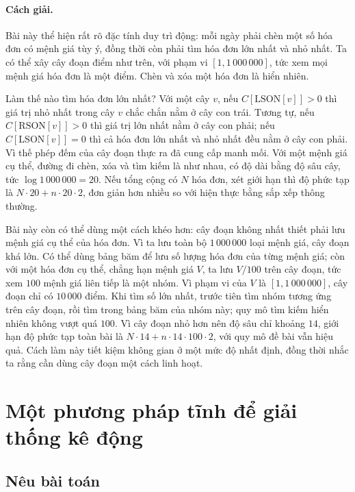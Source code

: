 \documentclass[11pt]{article}
\begin{document}
\paragraph{Cách giải.}
Bài này thể hiện rất rõ đặc tính duy trì động: mỗi ngày phải chèn một số hóa
đơn có mệnh giá tùy ý, đồng thời còn phải tìm hóa đơn lớn nhất và nhỏ nhất.
Ta có thể xây cây đoạn điểm như trên, với phạm vi \([1,1\,000\,000]\), tức
xem mọi mệnh giá hóa đơn là một điểm. Chèn và xóa một hóa đơn là hiển nhiên.

Làm thế nào tìm hóa đơn lớn nhất? Với một cây \(v\), nếu
\(C[\mathrm{LSON}[v]]>0\) thì giá trị nhỏ nhất trong cây \(v\) chắc chắn nằm
ở cây con trái. Tương tự, nếu \(C[\mathrm{RSON}[v]]>0\) thì giá trị lớn nhất
nằm ở cây con phải; nếu \(C[\mathrm{LSON}[v]]=0\) thì cả hóa đơn lớn nhất và
nhỏ nhất đều nằm ở cây con phải. Vì thế phép đếm của cây đoạn thực ra đã cung
cấp manh mối. Với một mệnh giá cụ thể, đường đi chèn, xóa và tìm kiếm là như
nhau, có độ dài bằng độ sâu cây, tức \(\log 1\,000\,000=20\). Nếu tổng cộng
có \(N\) hóa đơn, xét giới hạn thì độ phức tạp là
\(N\cdot 20+n\cdot 20\cdot 2\), đơn giản hơn nhiều so với hiện thực bằng sắp
xếp thông thường.

Bài này còn có thể dùng một cách khéo hơn: cây đoạn không nhất thiết phải lưu
mệnh giá cụ thể của hóa đơn. Vì ta lưu toàn bộ \(1\,000\,000\) loại mệnh giá,
cây đoạn khá lớn. Có thể dùng bảng băm để lưu số lượng hóa đơn của từng mệnh
giá; còn với một hóa đơn cụ thể, chẳng hạn mệnh giá \(V\), ta lưu \(V/100\)
trên cây đoạn, tức xem \(100\) mệnh giá liên tiếp là một nhóm. Vì phạm vi của
\(V\) là \([1,1\,000\,000]\), cây đoạn chỉ có \(10\,000\) điểm. Khi tìm số lớn
nhất, trước tiên tìm nhóm tương ứng trên cây đoạn, rồi tìm trong bảng băm của
nhóm này; quy mô tìm kiếm hiển nhiên không vượt quá \(100\). Vì cây đoạn nhỏ
hơn nên độ sâu chỉ khoảng \(14\), giới hạn độ phức tạp toàn bài là
\(N\cdot 14+n\cdot 14\cdot 100\cdot 2\), với quy mô đề bài vẫn hiệu quả. Cách
làm này tiết kiệm không gian ở một mức độ nhất định, đồng thời nhắc ta rằng
cần dùng cây đoạn một cách linh hoạt.

\section{Một phương pháp tĩnh để giải thống kê động}

\subsection{Nêu bài toán}
\end{document}
